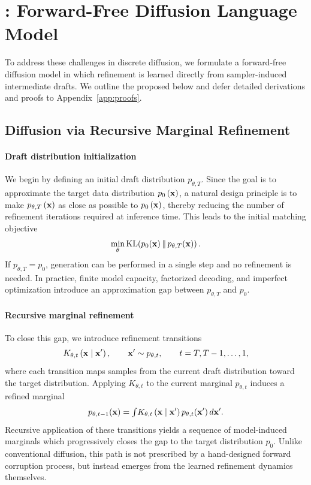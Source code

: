 
\section{\method: Forward-Free Diffusion Language Model}

\label{sec:method}
To address these challenges in discrete diffusion, we formulate a forward-free diffusion model in which refinement is learned directly from sampler-induced intermediate drafts. 
We outline the proposed \method below and defer detailed derivations and proofs to Appendix~\ref{app:proofs}.

\subsection{Diffusion via Recursive Marginal Refinement}

\paragraph{Draft distribution initialization}
We begin by defining an initial draft distribution $p_{\theta,T}$. 
Since the goal is to approximate the target data distribution $p_0\left(\mathbf{x}\right)$, a natural design principle is to make $p_{\theta,T}\left(\mathbf{x}\right)$ as close as possible to $p_0\left(\mathbf{x}\right)$, thereby reducing the number of refinement iterations required at inference time. 
This leads to the initial matching objective
\begin{equation}
    \min_{\theta}\operatorname{KL}\!\left(p_0(\mathbf{x})\,\|\,p_{\theta, T}(\mathbf{x})\right).
    \label{eq:init_kl}
\end{equation}
If $p_{\theta,T}=p_0$, generation can be performed in a single step and no refinement is needed. 
In practice, finite model capacity, factorized decoding, and imperfect optimization introduce an approximation gap between $p_{\theta,T}$ and $p_0$.

\paragraph{Recursive marginal refinement} 
To close this gap, we introduce refinement transitions 
\begin{equation}
    K_{ \theta, t}\left(\mathbf{x}\mid \mathbf{x}'\right), \qquad\mathbf{x}'\sim p_{\theta, t},\qquad t=T, T-1,\ldots,1,
    \label{eq:refiner_transition}
\end{equation}
where each transition maps samples from the current draft distribution toward the target distribution. 
Applying $K_{\theta,t}$ to the current marginal $p_{\theta,t}$ induces a refined marginal
\begin{equation}
     p_{\theta, t-1}(\mathbf{x})={\textstyle \int} K_{\theta,t}\left(\mathbf{x}\mid \mathbf{x}'\right)p_{\theta, t}(\mathbf{x}')\,d\mathbf{x}'.
    \label{eq:refined_marginal}
\end{equation}
Recursive application of these transitions yields a sequence of model-induced marginals
which progressively closes the gap to the target distribution $p_0$. 
Unlike conventional diffusion, this path is not prescribed by a hand-designed forward corruption process, but instead emerges from the learned refinement dynamics themselves.

